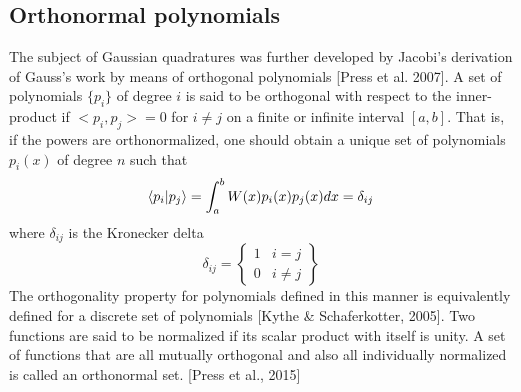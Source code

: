 \documentclass[%
reprint,
amsmath,amssymb,
aps,
]{revtex4-1}
\begin{document}
\subsection{Orthonormal polynomials} \noindent 
The subject of Gaussian quadratures was further developed by Jacobi's derivation of Gauss's work by means of orthogonal polynomials [Press et al. 2007]. A set of polynomials $\{p_i\}$ of degree $i$ is said to be orthogonal with respect to the inner-product if $<p_i, p_j> = 0$ for $i\not = j$ on a finite or infinite interval $[a,b]$. That is, if the powers are orthonormalized, one should obtain a unique set of polynomials $p_i(x)$ of degree $n$ such that
\begin{equation}
	\braket{p_i}{p_j} = 
	\int_{a}^{b} W(x)p_i(x)p_j(x)dx = \delta_{ij} 
\end{equation}
where $\delta_{ij}$ is the Kronecker delta
\begin{equation}
	\delta_{ij} = \left\{
	\begin{array}{ll}
	1 & i = j\\
	0 & i \not =j 
	\end{array} \right\}
\end{equation}
The orthogonality property for polynomials defined in this manner is equivalently defined for a discrete set of polynomials [Kythe \& Schaferkotter, 2005]. Two functions are said to be normalized if its scalar product with itself is unity. A set of functions that are all mutually orthogonal and also all  individually normalized is called an orthonormal set.  [Press et al., 2015]
\end{document}
